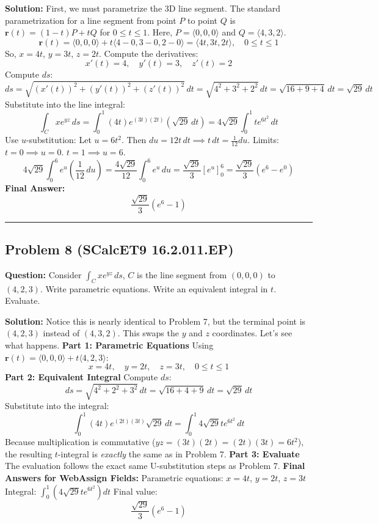 \documentclass{article}
\begin{document}
\textbf{Solution:}
First, we must parametrize the 3D line segment. The standard parametrization for a line segment from point $P$ to point $Q$ is $\mathbf{r}(t) = (1-t)P + tQ$ for $0 \leq t \leq 1$.
Here, $P = \langle 0,0,0 \rangle$ and $Q = \langle 4,3,2 \rangle$.
\[ \mathbf{r}(t) = \langle 0,0,0 \rangle + t\langle 4-0, 3-0, 2-0 \rangle = \langle 4t, 3t, 2t \rangle, \quad 0 \leq t \leq 1 \]
So, $x = 4t$, $y = 3t$, $z = 2t$.
Compute the derivatives:
\[ x'(t) = 4, \quad y'(t) = 3, \quad z'(t) = 2 \]
Compute $ds$:
\[ ds = \sqrt{(x'(t))^2 + (y'(t))^2 + (z'(t))^2} \, dt = \sqrt{4^2 + 3^2 + 2^2} \, dt = \sqrt{16 + 9 + 4} \, dt = \sqrt{29} \, dt \]
Substitute into the line integral:
\[ \int_C xe^{yz} \, ds = \int_0^1 (4t) e^{(3t)(2t)} (\sqrt{29} \, dt) = 4\sqrt{29} \int_0^1 t e^{6t^2} \, dt \]
Use $u$-substitution: Let $u = 6t^2$. Then $du = 12t \, dt \implies t \, dt = \frac{1}{12} du$.
Limits: $t = 0 \implies u = 0$. $t = 1 \implies u = 6$.
\[ 4\sqrt{29} \int_0^6 e^u \left(\frac{1}{12} \, du\right) = \frac{4\sqrt{29}}{12} \int_0^6 e^u \, du = \frac{\sqrt{29}}{3} \left[ e^u \right]_0^6 = \frac{\sqrt{29}}{3}(e^6 - e^0) \]
\textbf{Final Answer:} 
\[ \frac{\sqrt{29}}{3}(e^6 - 1) \]

\hrule \vspace{0.5cm}

\subsection{Problem 8 (SCalcET9 16.2.011.EP)}
\textbf{Question:} Consider $\int_C xe^{yz} \, ds$, $C$ is the line segment from $(0,0,0)$ to $(4,2,3)$. Write parametric equations. Write an equivalent integral in $t$. Evaluate.

\textbf{Solution:}
Notice this is nearly identical to Problem 7, but the terminal point is $(4,2,3)$ instead of $(4,3,2)$. This swaps the $y$ and $z$ coordinates. Let's see what happens.
\textbf{Part 1: Parametric Equations}
Using $\mathbf{r}(t) = \langle 0,0,0 \rangle + t\langle 4,2,3 \rangle$:
\[ x = 4t, \quad y = 2t, \quad z = 3t, \quad 0 \leq t \leq 1 \]
\textbf{Part 2: Equivalent Integral}
Compute $ds$:
\[ ds = \sqrt{4^2 + 2^2 + 3^2} \, dt = \sqrt{16 + 4 + 9} \, dt = \sqrt{29} \, dt \]
Substitute into the integral:
\[ \int_0^1 (4t) e^{(2t)(3t)} \sqrt{29} \, dt = \int_0^1 4\sqrt{29} t e^{6t^2} \, dt \]
Because multiplication is commutative ($yz = (3t)(2t) = (2t)(3t) = 6t^2$), the resulting $t$-integral is \textit{exactly} the same as in Problem 7.
\textbf{Part 3: Evaluate}
The evaluation follows the exact same U-substitution steps as Problem 7.
\textbf{Final Answers for WebAssign Fields:}
Parametric equations: $x = 4t$, $y = 2t$, $z = 3t$
Integral: $\int_0^1 \left( 4\sqrt{29} t e^{6t^2} \right) dt$
Final value: 
\[ \frac{\sqrt{29}}{3}(e^6 - 1) \]
\end{document}
